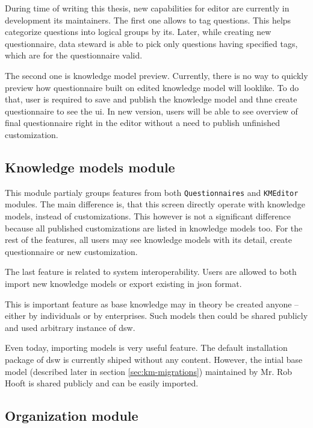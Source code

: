 During time of writing this thesis, new capabilities for editor are currently in development its maintainers.
The first one allows to tag questions.
This helps categorize questions into logical groups by its.
Later, while creating new questionnaire, data steward is able to pick only questions having specified tags, which are for the questionnaire valid.

The second one is knowledge model preview.
Currently, there is no way to quickly preview how questionnaire built on edited knowledge model will looklike.
To do that, user is required to save and publish the knowledge model and thne create questionnaire to see the \gls{ui}.
In new version, users will be able to see overview of final questionnaire right in the editor without a need to publish unfinished customization.


\subsection{Knowledge models module}

This module partialy groups features from both \texttt{Questionnaires} and \texttt{KMEditor} modules.
The main difference is, that this screen directly operate with knowledge models, instead of customizations.
This however is not a significant difference because all published customizations are listed in knowledge models too.
For the rest of the features, all users may see knowledge models with its detail, create questionnaire or new customization.

The last feature is related to system interoperability.
Users are allowed to both import new knowledge models or export existing in \gls{json} format.

This is important feature as base knowledge may in theory be created anyone -- either by individuals or by enterprises.
Such models then could be shared publicly and used arbitrary instance of \gls{dsw}.

Even today, importing models is very useful feature.
The default installation package of \gls{dsw} is currently shiped without any content.
However, the intial base model (described later in section \ref{sec:km-migrations}) maintained by Mr. Rob Hooft is shared publicly and can be easily imported.

\subsection{Organization module}


